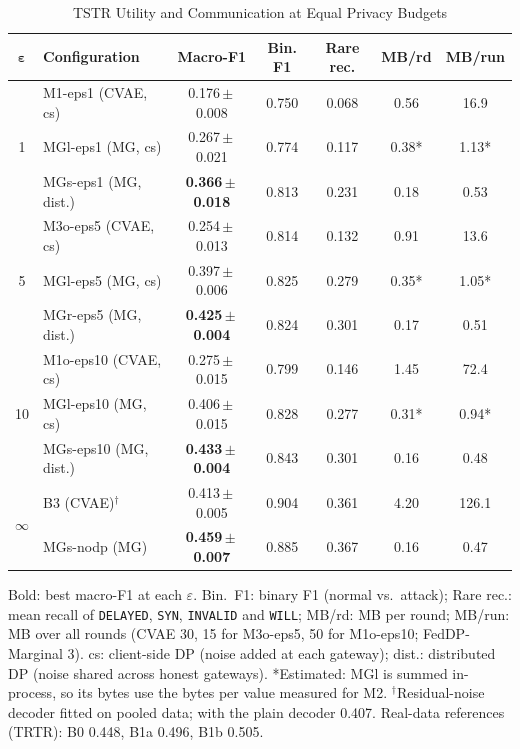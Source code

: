 \begin{table}[!t]
\centering
\caption{TSTR Utility and Communication at Equal Privacy Budgets}
\label{tab:main}
\scriptsize
\setlength{\tabcolsep}{2.2pt}
\begin{tabular}{c l c c c c c}
\toprule
$\boldsymbol{\varepsilon}$ & \textbf{Configuration} & \textbf{Macro-F1} & \textbf{Bin. F1} & \textbf{Rare rec.} & \textbf{MB/rd} & \textbf{MB/run} \\
\midrule
\multirow{3}{*}{1}  & M1-eps1 (CVAE, cs)        & 0.176\,$\pm$\,0.008 & 0.750 & 0.068 & 0.56 & 16.9 \\
                    & MGl-eps1 (MG, cs)         & 0.267\,$\pm$\,0.021 & 0.774 & 0.117 & 0.38* & 1.13* \\
                    & MGs-eps1 (MG, dist.)      & \textbf{0.366\,$\pm$\,0.018} & 0.813 & 0.231 & 0.18 & 0.53 \\
\midrule
\multirow{3}{*}{5}  & M3o-eps5 (CVAE, cs)       & 0.254\,$\pm$\,0.013 & 0.814 & 0.132 & 0.91 & 13.6 \\
                    & MGl-eps5 (MG, cs)         & 0.397\,$\pm$\,0.006 & 0.825 & 0.279 & 0.35* & 1.05* \\
                    & MGr-eps5 (MG, dist.)      & \textbf{0.425\,$\pm$\,0.004} & 0.824 & 0.301 & 0.17 & 0.51 \\
\midrule
\multirow{3}{*}{10} & M1o-eps10 (CVAE, cs)      & 0.275\,$\pm$\,0.015 & 0.799 & 0.146 & 1.45 & 72.4 \\
                    & MGl-eps10 (MG, cs)        & 0.406\,$\pm$\,0.015 & 0.828 & 0.277 & 0.31* & 0.94* \\
                    & MGs-eps10 (MG, dist.)     & \textbf{0.433\,$\pm$\,0.004} & 0.843 & 0.301 & 0.16 & 0.48 \\
\midrule
\multirow{2}{*}{$\infty$} & B3 (CVAE)$^\dagger$  & 0.413\,$\pm$\,0.005 & 0.904 & 0.361 & 4.20 & 126.1 \\
                    & MGs-nodp (MG)             & \textbf{0.459\,$\pm$\,0.007} & 0.885 & 0.367 & 0.16 & 0.47 \\
\bottomrule
\end{tabular}

\vspace{2pt}
\parbox{\columnwidth}{\scriptsize Bold: best macro-F1 at each $\varepsilon$. Bin.\ F1: binary F1 (normal vs.\ attack); Rare rec.: mean recall of \texttt{DELAYED}, \texttt{SYN}, \texttt{INVALID} and \texttt{WILL}; MB/rd: MB per round; MB/run: MB over all rounds (CVAE 30, 15 for M3o-eps5, 50 for M1o-eps10; FedDP-Marginal 3). cs: client-side DP (noise added at each gateway); dist.: distributed DP (noise shared across honest gateways). *Estimated: MGl is summed in-process, so its bytes use the bytes per value measured for M2. $^\dagger$Residual-noise decoder fitted on pooled data; with the plain decoder 0.407. Real-data references (TRTR): B0 0.448, B1a 0.496, B1b 0.505.}
\end{table}

